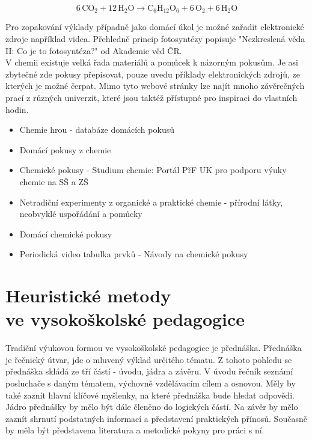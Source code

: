     \begin{equation}
        6\, \mathrm{CO_{2}} + 12\, \mathrm{H_{2}O} \rightarrow \mathrm{C_{6}H_{12}O_{6}} + 6\, \mathrm{O_{2}} + 6\, \mathrm{H_{2}O}
    \end{equation}

Pro zopakování výklady případně jako domácí úkol je možné zařadit elektronické zdroje například videa. Přehledně princip fotosyntézy popisuje "Nezkreslená věda II: Co je to fotosyntéza?" od Akademie věd ČR. \cite{nezkreslena_veda_fotosynteza}\\

V chemii existuje velká řada materiálů a pomůcek k názorným pokusům. Je asi zbytečné zde pokusy přepisovat, pouze uvedu příklady elektronických zdrojů, ze kterých je možné čerpat. Mimo tyto webové stránky lze najít mnoho závěrečných prací z různých univerzit, které jsou taktéž přístupné pro inspiraci do vlastních hodin.

    \begin{itemize}
        \item Chemie hrou - databáze domácích pokusů \cite{chemiehrou}
        \item Domácí pokusy z chemie \cite{pokusy_zsletohrad}
        \item Chemické pokusy - Studium chemie: Portál PřF UK pro podporu výuky chemie na SŠ a ZŠ \cite{chemicke_pokusy_pruk}
        \item Netradiční experimenty z organické a praktické chemie - přírodní látky, neobvyklé uspořádání a pomůcky \cite{sulcova2007}
        \item Domácí chemické pokusy \cite{domaci_chemicke_pokusy_dusova}
        \item Periodická video tabulka prvků - Návody na chemické pokusy \cite{chemicke_prvky}
    \end{itemize}

\chapter{Heuristické metody \\ve vysokoškolské pedagogice}

Tradiční výukovou formou ve vysokoškolské pedagogice je přednáška. Přednáška je řečnický útvar, jde o mluvený výklad určitého tématu. Z tohoto pohledu se přednáška skládá ze tří částí - úvodu, jádra a závěru. V úvodu řečník seznámí posluchače s daným tématem, výchovně vzdělávacím cílem a osnovou. Měly by také zaznít hlavní klíčové myšlenky, na které přednáška bude hledat odpovědi. Jádro přednášky by mělo být dále členěno do logických částí. Na závěr by mělo zaznít shrnutí podstatných informací a představení praktických přínosů. Současně by měla být představena literatura a metodické pokyny pro práci s ní. \cite{slavik2012,elergning_ujak_prednaska} \\


